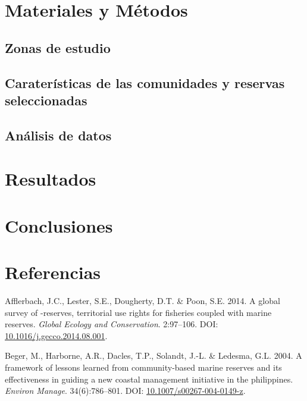 \documentclass[12pt,]{article}
\begin{document}
\section{Materiales y Métodos}\label{materiales-y-metodos}

\subsection{Zonas de estudio}\label{zonas-de-estudio}

\subsection{Caraterísticas de las comunidades y reservas
seleccionadas}\label{carateristicas-de-las-comunidades-y-reservas-seleccionadas}

\subsection{Análisis de datos}\label{analisis-de-datos}

\section{Resultados}\label{resultados}

\section{Conclusiones}\label{conclusiones}

\section*{Referencias}\label{referencias}

\hypertarget{refs}{}
\hypertarget{ref-afflerbach_2014-HP}{}
Afflerbach, J.C., Lester, S.E., Dougherty, D.T. \& Poon, S.E. 2014. A
global survey of -reserves, territorial use rights for fisheries coupled
with marine reserves. \emph{Global Ecology and Conservation}. 2:97--106.
DOI:
\href{https://doi.org/10.1016/j.gecco.2014.08.001}{10.1016/j.gecco.2014.08.001}.

\hypertarget{ref-beger_2004-Y8}{}
Beger, M., Harborne, A.R., Dacles, T.P., Solandt, J.-L. \& Ledesma, G.L.
2004. A framework of lessons learned from community-based marine
reserves and its effectiveness in guiding a new coastal management
initiative in the philippines. \emph{Environ Manage}. 34(6):786--801.
DOI:
\href{https://doi.org/10.1007/s00267-004-0149-z}{10.1007/s00267-004-0149-z}.
\end{document}
